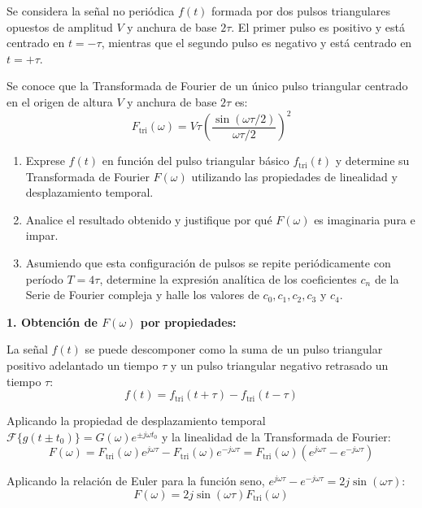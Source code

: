 \begin{problema}
Se considera la señal no periódica $f(t)$ formada por dos pulsos triangulares opuestos de amplitud $V$ y anchura de base $2\tau$. El primer pulso es positivo y está centrado en $t = -\tau$, mientras que el segundo pulso es negativo y está centrado en $t = +\tau$.

Se conoce que la Transformada de Fourier de un único pulso triangular centrado en el origen de altura $V$ y anchura de base $2\tau$ es:
\[ F_{\text{tri}}(\omega) = V \tau \left( \frac{\sin(\omega \tau / 2)}{\omega \tau / 2} \right)^2 \]

\begin{enumerate}
    \item Exprese $f(t)$ en función del pulso triangular básico $f_{\text{tri}}(t)$ y determine su Transformada de Fourier $F(\omega)$ utilizando las propiedades de linealidad y desplazamiento temporal.
    \item Analice el resultado obtenido y justifique por qué $F(\omega)$ es imaginaria pura e impar.
    \item Asumiendo que esta configuración de pulsos se repite periódicamente con período $T = 4\tau$, determine la expresión analítica de los coeficientes $c_n$ de la Serie de Fourier compleja y halle los valores de $c_0, c_1, c_2, c_3$ y $c_4$.
\end{enumerate}

\tcblower

\textbf{1. Obtención de $F(\omega)$ por propiedades:}

La señal $f(t)$ se puede descomponer como la suma de un pulso triangular positivo adelantado un tiempo $\tau$ y un pulso triangular negativo retrasado un tiempo $\tau$:
\[ f(t) = f_{\text{tri}}(t + \tau) - f_{\text{tri}}(t - \tau) \]

Aplicando la propiedad de desplazamiento temporal $\mathcal{F}\{g(t \pm t_0)\} = G(\omega) e^{\pm j\omega t_0}$ y la linealidad de la Transformada de Fourier:
\[ F(\omega) = F_{\text{tri}}(\omega) e^{j\omega \tau} - F_{\text{tri}}(\omega) e^{-j\omega \tau} = F_{\text{tri}}(\omega) \left( e^{j\omega \tau} - e^{-j\omega \tau} \right) \]

Aplicando la relación de Euler para la función seno, $e^{j\omega \tau} - e^{-j\omega \tau} = 2j \sin(\omega \tau)$:
\[ F(\omega) = 2j \sin(\omega \tau) F_{\text{tri}}(\omega) \]


\end{problema}
